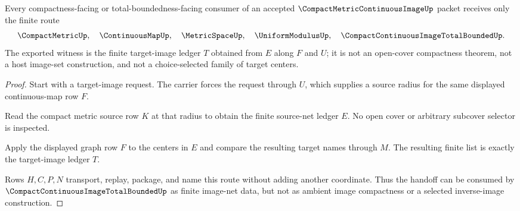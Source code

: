 \begin{theorem}
\label{thm:compact-metric-continuous-image-finite-net-handoff}
Every compactness-facing or total-boundedness-facing consumer of an accepted $\CompactMetricContinuousImageUp$ packet receives only the finite route
$$
\CompactMetricUp,\quad
\ContinuousMapUp,\quad
\MetricSpaceUp,\quad
\UniformModulusUp,\quad
\CompactContinuousImageTotalBoundedUp .
$$
The exported witness is the finite target-image ledger $T$ obtained from $E$ along $F$ and $U$; it is not an open-cover compactness theorem, not a host image-set construction, and not a choice-selected family of target centers.
\end{theorem}
\begin{proof}
Start with a target-image request. The carrier forces the request through $U$, which supplies a source radius for the same displayed continuous-map row $F$.

Read the compact metric source row $K$ at that radius to obtain the finite source-net ledger $E$. No open cover or arbitrary subcover selector is inspected.

Apply the displayed graph row $F$ to the centers in $E$ and compare the resulting target names through $M$. The resulting finite list is exactly the target-image ledger $T$.

Rows $H,C,P,N$ transport, replay, package, and name this route without adding another coordinate. Thus the handoff can be consumed by $\CompactContinuousImageTotalBoundedUp$ as finite image-net data, but not as ambient image compactness or a selected inverse-image construction.
\end{proof}


\begin{closurestatus}{\CompactMetricContinuousImageUp}
  \theoryclosure{\seedClosure}
  \formalstatus{\unformalizedV}
\end{closurestatus}
